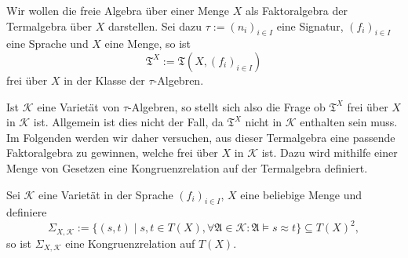 \begin{remark}
    Wir wollen die freie Algebra über einer Menge $X$ als Faktoralgebra der Termalgebra über $X$ darstellen. Sei dazu $\tau := (n_i)_{i \in I}$ eine Signatur, $(f_i)_{i\in I}$ eine Sprache und $X$ eine Menge, so ist $$ \mathfrak{T}^X := \mathfrak{T}(X, (f_i)_{i \in I}) $$
    frei über $X$ in der Klasse der $\tau$-Algebren.

    Ist $\mathcal{K}$ eine Varietät von $\tau$-Algebren, so stellt sich also die Frage ob $\mathfrak{T}^X$ frei über $X$ in $\mathcal{K}$ ist. Allgemein ist dies nicht der Fall, da $\mathfrak{T}^X$ nicht in $\mathcal{K}$ enthalten sein muss. Im Folgenden werden wir daher versuchen, aus dieser Termalgebra eine passende Faktoralgebra zu gewinnen, welche frei über $X$ in $\mathcal{K}$ ist. Dazu wird mithilfe einer Menge von Gesetzen eine Kongruenzrelation auf der Termalgebra definiert.
\end{remark}

\begin{proposition}
    Sei $\mathcal{K}$ eine Varietät in der Sprache $(f_i)_{i\in I}$, $X$ eine beliebige Menge und definiere $$ \Sigma_{X,\mathcal{K}} := \{ (s, t) \mid s, t \in T(X), \forall \mathfrak{A} \in \mathcal{K}: \mathfrak{A} \models s \approx t \} \subseteq T(X)^2, $$
    so ist $\Sigma_{X,\mathcal{K}}$ eine Kongruenzrelation auf $T(X)$.
\end{proposition}


